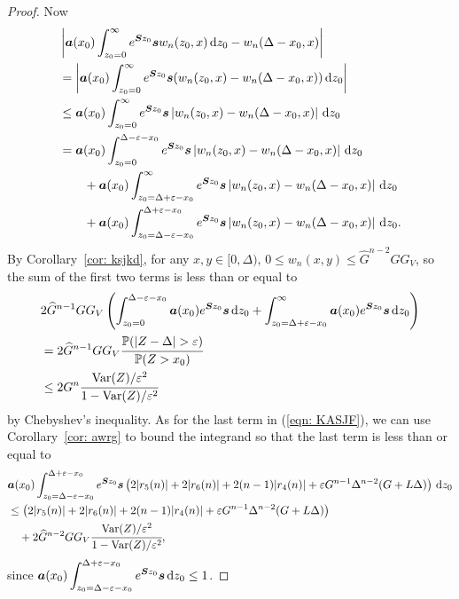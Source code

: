 \begin{proof}
	Now
	\begin{align}
		\nonumber&\left|\boldsymbol a (x_0) \int_{z_0=0}^\infty e^{\boldsymbol Sz_0}\boldsymbol sw_n(z_0,x)\, \mathrm{d} z_0 - w_n(\Delta - x_0,x) \right|
		\\\nonumber&= \left|\boldsymbol a (x_0) \int_{z_0=0}^\infty e^{\boldsymbol Sz_0}\boldsymbol s(w_n(z_0,x) - w_n(\Delta - x_0,x)) \, \mathrm{d} z_0\right|
		\\\nonumber&\leq \boldsymbol a (x_0) \int_{z_0=0}^\infty e^{\boldsymbol Sz_0}\boldsymbol s  \left|w_n(z_0,x) - w_n(\Delta - x_0,x)\right| \, \mathrm{d} z_0
		\\\nonumber&= \boldsymbol a (x_0) \int_{z_0=0}^{\Delta-\varepsilon-x_0} e^{\boldsymbol Sz_0}\boldsymbol s  \left|w_n(z_0,x) - w_n(\Delta - x_0,x)\right| \, \mathrm{d} z_0
		\\\nonumber&\qquad{}+\boldsymbol a (x_0) \int_{z_0=\Delta+\varepsilon-x_0}^\infty e^{\boldsymbol Sz_0}\boldsymbol s  \left|w_n(z_0,x) - w_n(\Delta - x_0,x)\right| \, \mathrm{d} z_0
		\\\label{eqn: KASJF}&\qquad{}+\boldsymbol a (x_0) \int_{z_0=\Delta-\varepsilon-x_0}^{\Delta+\varepsilon-x_0} e^{\boldsymbol Sz_0}\boldsymbol s  \left|w_n(z_0,x) - w_n(\Delta - x_0,x)\right| \, \mathrm{d} z_0.
		\end{align}
		By Corollary~\ref{cor: ksjkd}, for any \(x,y\in [0,\Delta)\), \(0\leq w_n(x,y)\leq \widehat G^{n-2}GG_V\), so the sum of the first two terms is less than or equal to 
		\begin{align}
		&2\widehat G^{n-1}GG_V\left(\int_{z_0=0}^{\Delta-\varepsilon-x_0}\bs a(x_0)e^{\bs S z_0} \bs s \wrt z_0+\int_{z_0=\Delta+\varepsilon-x_0}^\infty \bs a(x_0)e^{\bs S z_0} \bs s \wrt z_0\right)
		\\\nonumber &= 2\widehat G^{n-1}GG_V \cfrac{\mathbb P(|Z-\Delta|> \varepsilon)}{\mathbb P(Z> x_0)}
		\\&\leq 2G^n\cfrac{\var(Z)/\varepsilon^2}{1-\var(Z)/\varepsilon^2}
		\end{align}
		by Chebyshev's inequality. As for the last term in (\ref{eqn: KASJF}), we can use Corollary~\ref{cor: awrg} to bound the integrand so that the last term is less than or equal to 
		\begin{align}
		\nonumber&\boldsymbol a (x_0) \int_{z_0=\Delta-\varepsilon-x_0}^{\Delta+\varepsilon-x_0} e^{\boldsymbol Sz_0}\boldsymbol s \left( 2|r_5(n)| + 2|r_6(n)| + 2(n-1)|r_4(n)| + \varepsilon G^{n-1}\Delta^{n-2}(G+L\Delta) \right) \, \mathrm{d} z_0
		\\\nonumber&\leq  \left( 2|r_5(n)| + 2|r_6(n)| + 2(n-1)|r_4(n)| + \varepsilon G^{n-1}\Delta^{n-2}(G+L\Delta) \right)
		\\&\quad{}+2\widehat G^{n-2}GG_V\cfrac{\mathrm{Var}(Z)/\varepsilon^2}{1-\mathrm{Var}(Z)/\varepsilon^2} ,
	\end{align}
	since \(\displaystyle \boldsymbol a (x_0) \int_{z_0=\Delta-\varepsilon-x_0}^{\Delta+\varepsilon-x_0} e^{\boldsymbol Sz_0}\boldsymbol s\, \mathrm{d} z_0\leq 1\). 
\end{proof}

